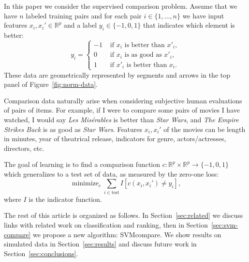 \documentclass{article}
\newcommand{\SVMcompare}{SVMcompare}
\newcommand{\RR}{\mathbb R}
\DeclareMathOperator*{\minimize}{minimize}
\begin{document}
In this paper we consider the supervised comparison problem. Assume
that we have $n$ labeled training pairs and for each pair
$i\in\{1,\dots,n\}$ we have input features $x_i,x_i'\in\RR^p$ and a
label $y_i\in\{-1,0,1\}$ that indicates which element is better:
\begin{equation}
  \label{eq:z}
  y_i =
  \begin{cases}
    -1 & \text{ if $x_i$ is better than $x'_i$},\\
    0 & \text{ if $x_i$ is as good as $x'_i$},\\
    1 & \text{ if $x'_i$ is better than $x_i$}.
  \end{cases}
\end{equation}
These data are geometrically represented by segments and arrows in the
top panel of Figure~\ref{fig:norm-data}. 

Comparison data naturally
arise when considering subjective human evaluations of pairs of
items. For example, if I were to compare some
pairs of movies I have watched, I would say \textit{Les Mis\'erables}
is better than \textit{Star Wars}, and \textit{The Empire Strikes
  Back} is as good as \textit{Star Wars}. Features $x_i,x_i'$ of the
movies can be length in minutes, year of theatrical release,
indicators for genre, actors/actresses, directors, etc.

The goal of learning is to find a comparison function $c:\RR^p \times
\RR^p \rightarrow \{-1,0,1\}$ which generalizes to a test set of data,
as measured by the zero-one loss:
\begin{equation}
  \label{eq:min_c}
  \minimize_{c} 
  \sum_{i\in\text{test}}
  I\left[ c(x_i, x_i')\neq y_i \right],
\end{equation}
where $I$ is the indicator function.


The rest of this article is organized as follows. In
Section~\ref{sec:related} we discuss links with related work on
classification and ranking, then in Section~\ref{sec:svm-compare} we
propose a new algorithm: \SVMcompare. We show results on simulated
data in Section~\ref{sec:results} and discuss future work in
Section~\ref{sec:conclusions}.
\end{document}
